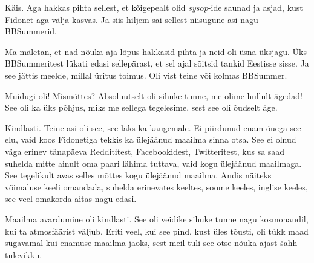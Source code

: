 
Käis. Aga hakkas pihta sellest, et kõigepealt olid \emph{sysop}-ide saunad ja 
asjad, kust Fidonet aga välja kasvas. Ja siis hiljem sai sellest niisugune asi 
nagu BBSummerid.
                 
                 
Ma mäletan, et nad nõuka-aja lõpus hakkasid pihta ja neid oli üsna üksjagu. Üks 
BBSummeritest lükati edasi sellepärast, et sel ajal sõitsid tankid Eestisse 
sisse. Ja see jättis meelde, millal üritus toimus. Oli vist teine või kolmas 
BBSummer.
                 

Muidugi oli! Mismõttes? Absoluutselt oli sihuke tunne, me olime hullult ägedad! 
See oli ka üks põhjus, miks me sellega tegelesime, sest see oli õudselt äge.


Kindlasti. Teine asi oli see, see läks ka kaugemale. Ei piirdunud enam õuega 
see elu, vaid koos Fidonetiga tekkis ka ülejäänud maailma sinna otsa. See ei 
olnud väga erinev tänapäeva Reddititest, Facebookidest, Twitteritest, kus sa 
saad suhelda mitte ainult oma paari lähima tuttava, vaid kogu ülejäänud 
maailmaga. See tegelikult avas selles mõttes kogu ülejäänud maailma. Andis 
näiteks võimaluse keeli omandada,  suhelda  erinevates keeltes, soome keeles, 
inglise keeles, see veel omakorda aitas nagu edasi.
                 

Maailma avardumine oli kindlasti. See oli veidike sihuke tunne nagu 
kosmonaudil, kui ta  atmosfäärist väljub. Eriti veel, kui see pind, kust üles 
tõusti, oli tükk maad sügavamal kui enamuse maailma jaoks, sest meil tuli see 
otse nõuka ajast šahh tulevikku.

